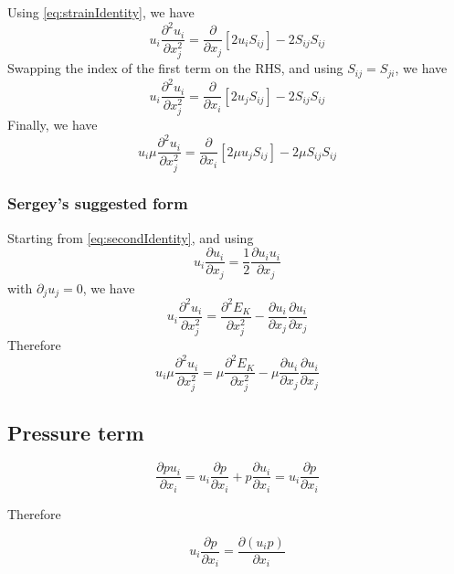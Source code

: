 \documentclass[11pt]{article}
\newcommand{\PD}{\partial}
\begin{document}
Using \ref{eq:strainIdentity}, we have
\begin{equation}
	u_i \frac{\PD^2 u_i}{\PD x_j^2} = 
	\frac{\PD}{\PD x_j} \left[ 2 u_i S_{ij} \right] - 
	2 S_{ij} S_{ij}
\end{equation}
Swapping the index of the first term on the RHS, and using $S_{ij}=S_{ji}$, we have
\begin{equation}
	u_i \frac{\PD^2 u_i}{\PD x_j^2} = 
	\frac{\PD}{\PD x_i} \left[ 2 u_j S_{ij} \right] - 
	2 S_{ij} S_{ij}
\end{equation}
Finally, we have
\begin{equation}
	\boxed{
	u_i \mu \frac{\PD^2 u_i}{\PD x_j^2} = 
	\frac{\PD}{\PD x_i} \left[ 2 \mu u_j S_{ij} \right] - 
	2 \mu S_{ij} S_{ij}
	}
\end{equation}

\subsubsection{Sergey's suggested form}
Starting from \ref{eq:secondIdentity}, and using 
\begin{equation}
	u_i \frac{\PD u_i}{\PD x_j} = 
	\frac{1}{2} \frac{\PD u_i u_i}{\PD x_j}
\end{equation}
with $\PD_j u_j = 0$, we have
\begin{equation}
	u_i \frac{\PD^2 u_i}{\PD x_j^2} = 
	\frac{\PD^2 E_K}{\PD x_j^2} - 
	\frac{\PD u_i}{\PD x_j}\frac{\PD u_i}{\PD x_j}
\end{equation}
Therefore
\begin{equation}
	\boxed{
	u_i \mu \frac{\PD^2 u_i}{\PD x_j^2} = 
	\mu \frac{\PD^2 E_K}{\PD x_j^2} - 
	\mu \frac{\PD u_i}{\PD x_j}\frac{\PD u_i}{\PD x_j}
	}
\end{equation}

\subsection{Pressure term}
\begin{equation}
	\frac{\PD p u_i}{\PD x_i}
	=
	u_i \frac{\PD p}{\PD x_i}
	+
	p \frac{\PD u_i}{\PD x_i}
	=
	u_i \frac{\PD p}{\PD x_i}
\end{equation}

Therefore

\begin{equation}
	\boxed{
	u_i \frac{\PD p}{\PD x_i} =
	\frac{\PD (u_i p)}{\PD x_i}
	}
\end{equation}
\end{document}
